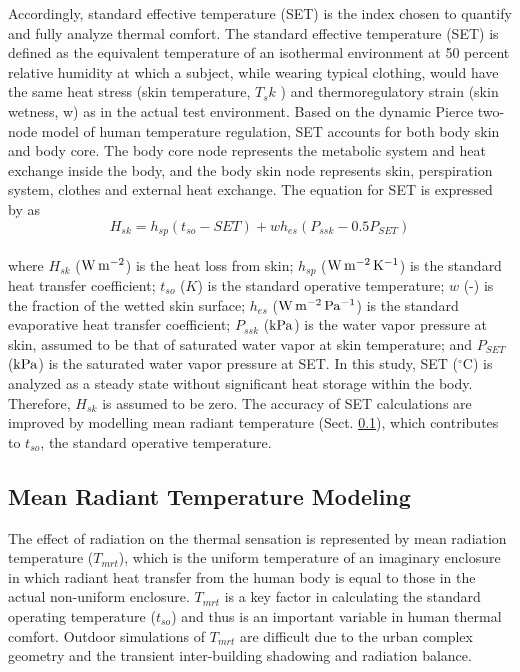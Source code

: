 \documentclass[smallextended]{svjour3}
\begin{document}
Accordingly, standard effective temperature (SET) is the index chosen to quantify and fully analyze thermal comfort. The standard effective temperature (SET) is defined as the equivalent temperature of an isothermal environment at 50 percent relative humidity at which a subject, while wearing typical clothing, would have the same heat stress (skin temperature, $T_sk$ ) and thermoregulatory strain (skin wetness, w) as in the actual test environment. Based on the dynamic Pierce two-node model of human temperature regulation, SET accounts for both body skin and body core. The body core node represents the metabolic system and heat exchange inside the body, and the body skin node represents skin, perspiration system, clothes and external heat exchange. The equation for SET is  expressed by \cite{gagge1986standard} as\\
\begin{equation}
H_{sk}=h_{sp}(t_{so}-SET)+wh_{es}(P_{ssk}-0.5P_{SET})
\label{Eqa.SET}
\end{equation}\\
where $H_{sk}$ ($\rm W\, m^{-2}$) is the heat loss from skin; $h_{sp}$ ($\rm W\, m^{-2}\,K^{-1}$) is the standard heat transfer coefficient; $t_{so}$ ($K$) is the standard operative temperature; $w$ (-) is the fraction of the wetted skin surface; $h_{es}$ ($\rm W\, m^{-2}\,Pa^{-1}$) is the standard evaporative heat transfer coefficient; $P_{ssk}$ ($\rm kPa$) is the water vapor pressure at skin, assumed to be that of saturated water vapor at skin temperature; and $P_{SET}$ ($\rm kPa$) is the saturated water vapor pressure at SET. In this study, SET ($^{\circ}$C) is analyzed as a steady state without significant heat storage within the body. Therefore, $H_{sk}$ is assumed to be zero. The accuracy of SET calculations are improved by modelling mean radiant temperature (Sect. \ref{sec:mrt}), which contributes to $t_{so}$, the standard operative temperature. 


\subsection{Mean Radiant Temperature Modeling}
\label{sec:mrt}
The effect of radiation on the thermal sensation is represented by mean radiation temperature ($T_{mrt}$), which is the uniform temperature of an imaginary enclosure in which radiant heat transfer from the human body is equal to those in the actual non-uniform enclosure. $T_{mrt}$ is a key factor in calculating the standard operating temperature ($t_{so}$) and thus is an important variable in human thermal comfort. Outdoor simulations of $T_{mrt}$ are difficult due to the urban complex geometry and the transient inter-building shadowing and radiation balance. 
\end{document}
